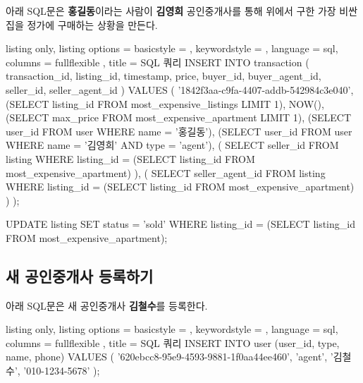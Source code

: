 \documentclass{article}
\begin{document}
아래 SQL문은 \textbf{홍길동}이라는 사람이 \textbf{김영희} 공인중개사를 통해 위에서 구한 가장 비싼 집을 정가에 구매하는 상황을 만든다.

\begin{tcblisting}{
    listing only,
    listing options = {
      basicstyle = \ttfamily,
      keywordstyle = \color{blue},
      language = sql,
      columns = fullflexible
    },
    title = SQL 쿼리
  }
  INSERT INTO transaction (
    transaction_id,
    listing_id,
    timestamp,
    price,
    buyer_id,
    buyer_agent_id,
    seller_id,
    seller_agent_id
  )
  VALUES (
    '1842f3aa-c9fa-4407-addb-542984c3e040',
    (SELECT listing_id FROM most_expensive_listings LIMIT 1),
    NOW(),
    (SELECT max_price FROM most_expensive_apartment LIMIT 1),
    (SELECT user_id FROM user WHERE name = '홍길동'),
    (SELECT user_id FROM user WHERE name = '김영희' AND type = 'agent'),
    (
      SELECT seller_id
      FROM listing
      WHERE listing_id = (SELECT listing_id FROM most_expensive_apartment)
    ),
    (
      SELECT seller_agent_id
      FROM listing
      WHERE listing_id = (SELECT listing_id FROM most_expensive_apartment)
    )
  );

  UPDATE listing
  SET status = 'sold'
  WHERE listing_id = (SELECT listing_id FROM most_expensive_apartment);
\end{tcblisting}
\newpage

\subsection{새 공인중개사 등록하기}

아래 SQL문은 새 공인중개사 \textbf{김철수}를 등록한다.

\begin{tcblisting}{
    listing only,
    listing options = {
      basicstyle = \ttfamily,
      keywordstyle = \color{blue},
      language = sql,
      columns = fullflexible
    },
    title = SQL 쿼리
  }
  INSERT INTO user (user_id, type, name, phone)
  VALUES (
    '620ebcc8-95e9-4593-9881-1f0aa44ee460',
    'agent',
    '김철수',
    '010-1234-5678'
  );
\end{tcblisting}
\end{document}
